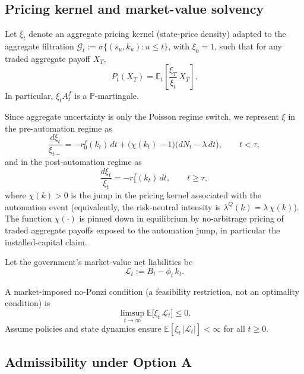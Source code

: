 \documentclass{article}
\begin{document}
\subsection{Pricing kernel and market-value solvency}

Let $\xi_t$ denote an aggregate pricing kernel (state-price density) adapted to the aggregate filtration
$\mathcal G_t:=\sigma\{(s_u,k_u):u\le t\}$, with $\xi_0=1$, such that for any traded aggregate payoff $X_T$,
\begin{equation}\label{eq:pricing_kernel_updated}
P_t(X_T)=\mathbb E_t\!\left[\frac{\xi_T}{\xi_t}\,X_T\right].
\end{equation}
In particular, $\xi_t A^f_t$ is a $\mathbb P$-martingale.

Since aggregate uncertainty is only the Poisson regime switch, we represent $\xi$ in the pre-automation regime as
\begin{equation}\label{eq:xi_pre_updated}
\frac{d\xi_t}{\xi_{t-}}
=
- r^f_0(k_t)\,dt
+ \big(\chi(k_t)-1\big)\big(dN_t-\lambda\,dt\big),
\qquad t<\tau,
\end{equation}
and in the post-automation regime as
\begin{equation}\label{eq:xi_post_updated}
\frac{d\xi_t}{\xi_t} = - r^f_1(k_t)\,dt,
\qquad t\ge \tau,
\end{equation}
where $\chi(k)>0$ is the jump in the pricing kernel associated with the automation event (equivalently, the risk-neutral intensity is $\lambda^Q(k)=\lambda\,\chi(k)$).
The function $\chi(\cdot)$ is pinned down in equilibrium by no-arbitrage pricing of traded aggregate payoffs exposed to the automation jump, in particular the installed-capital claim.

Let the government's market-value net liabilities be
\begin{equation}\label{eq:net_liabilities_updated}
\mathcal L_t := B_t - \phi_t\,k_t.
\end{equation}

A market-imposed no-Ponzi condition (a feasibility restriction, not an optimality condition) is
\begin{equation}\label{eq:npc_updated}
\limsup_{t\to\infty}\mathbb E\big[\xi_t\,\mathcal L_t\big]\le 0.
\end{equation}
Assume policies and state dynamics ensure $\mathbb E[\xi_t\,|\mathcal L_t|]<\infty$ for all $t\ge 0$.

\subsection{Admissibility under Option A}
\end{document}
